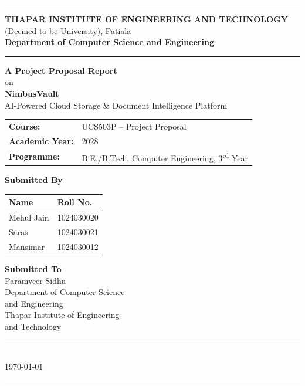 \documentclass[11pt,a4paper]{article}
\begin{document}
\begin{titlepage}
\centering
\thispagestyle{empty}

\vspace*{0.8cm}
\rule{\linewidth}{0.8pt}

\vspace{0.5cm}
{\Large \textbf{THAPAR INSTITUTE OF ENGINEERING AND TECHNOLOGY}}\\[4pt]
{\large (Deemed to be University), Patiala}\\[10pt]
{\large\textbf{Department of Computer Science and Engineering}}

\vspace{0.5cm}
\rule{\linewidth}{0.8pt}

\vspace{2.4cm}

{\large\bfseries A Project Proposal Report}\\[6pt]
{\normalsize on}\\[10pt]

{\huge \textbf{NimbusVault}}\\[8pt]
{\Large AI-Powered Cloud Storage \& Document Intelligence Platform}

\vspace{1.8cm}

\begin{tabular}{ll}
\textbf{Course:} & UCS503P -- Project Proposal \\[4pt]
\textbf{Academic Year:} & 2028 \\[4pt]
\textbf{Programme:} & B.E./B.Tech. Computer Engineering, 3\textsuperscript{rd} Year \\
\end{tabular}

\vspace{2.2cm}

\begin{minipage}{0.46\textwidth}
\centering
\textbf{Submitted By} \\[10pt]
\begin{tabular}{@{}ll@{}}
\textbf{Name} & \textbf{Roll No.} \\
\midrule
Mehul Jain & 1024030020 \\
Saras & 1024030021 \\
Mansimar & 1024030012 \\
\end{tabular}
\end{minipage}%
\begin{minipage}{0.46\textwidth}
\centering
\textbf{Submitted To} \\[10pt]
Paramveer Sidhu \\
Department of Computer Science \\ and Engineering \\
Thapar Institute of Engineering \\ and Technology
\end{minipage}

\vfill

\rule{\linewidth}{0.5pt}\\[4pt]
{\normalsize \today}\\[4pt]
\rule{\linewidth}{0.5pt}

\end{titlepage}
\end{document}
